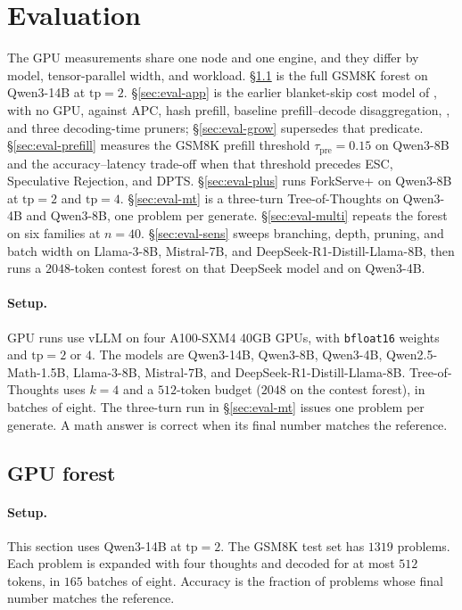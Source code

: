 \section{Evaluation}
\label{sec:eval}

The GPU measurements share one node and one engine, and they differ by model, tensor-parallel width, and workload.
\S\ref{sec:eval-gpu} is the full GSM8K forest on Qwen3-14B at $\mathrm{tp}{=}2$.
\S\ref{sec:eval-app} is the earlier blanket-skip cost model of \app, with no GPU, against APC, hash prefill, baseline prefill--decode disaggregation, \sys, and three decoding-time pruners; \S\ref{sec:eval-grow} supersedes that predicate.
\S\ref{sec:eval-prefill} measures the GSM8K prefill threshold $\tau_{\mathrm{pre}}{=}0.15$ on Qwen3-8B and the accuracy--latency trade-off when that threshold precedes ESC, Speculative Rejection, and DPTS.
\S\ref{sec:eval-plus} runs ForkServe+ on Qwen3-8B at $\mathrm{tp}{=}2$ and $\mathrm{tp}{=}4$.
\S\ref{sec:eval-mt} is a three-turn Tree-of-Thoughts on Qwen3-4B and Qwen3-8B, one problem per generate.
\S\ref{sec:eval-multi} repeats the forest on six families at $n{=}40$.
\S\ref{sec:eval-sens} sweeps branching, depth, pruning, and batch width on Llama-3-8B, Mistral-7B, and DeepSeek-R1-Distill-Llama-8B, then runs a $2048$-token contest forest on that DeepSeek model and on Qwen3-4B.

\paragraph{Setup.}
GPU runs use vLLM on four A100-SXM4 40GB GPUs, with \texttt{bfloat16} weights and $\mathrm{tp}{=}2$ or $4$.
The models are Qwen3-14B, Qwen3-8B, Qwen3-4B, Qwen2.5-Math-1.5B, Llama-3-8B, Mistral-7B, and DeepSeek-R1-Distill-Llama-8B.
Tree-of-Thoughts uses $k{=}4$ and a $512$-token budget ($2048$ on the contest forest), in batches of eight.
The three-turn run in \S\ref{sec:eval-mt} issues one problem per generate.
A math answer is correct when its final number matches the reference.

\subsection{GPU forest}
\label{sec:eval-gpu}

\paragraph{Setup.}
This section uses Qwen3-14B at $\mathrm{tp}{=}2$.
The GSM8K test set has $1319$ problems.
Each problem is expanded with four thoughts and decoded for at most $512$ tokens, in $165$ batches of eight.
Accuracy is the fraction of problems whose final number matches the reference.

